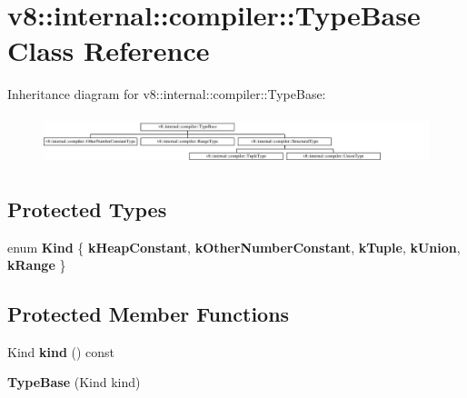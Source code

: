 \hypertarget{classv8_1_1internal_1_1compiler_1_1TypeBase}{}\section{v8\+:\+:internal\+:\+:compiler\+:\+:Type\+Base Class Reference}
\label{classv8_1_1internal_1_1compiler_1_1TypeBase}
Inheritance diagram for v8\+:\+:internal\+:\+:compiler\+:\+:Type\+Base\+:\begin{figure}[H]
\begin{center}
\leavevmode
\includegraphics[height=1.423729cm]{classv8_1_1internal_1_1compiler_1_1TypeBase}
\end{center}
\end{figure}
\subsection*{Protected Types}
\begin{DoxyCompactItemize}
\item 
\mbox{\label{classv8_1_1internal_1_1compiler_1_1TypeBase_a5ead011e7cd273a8618441ef9dc36a6c}} 
enum {\bfseries Kind} \{ \newline
{\bfseries k\+Heap\+Constant}, 
{\bfseries k\+Other\+Number\+Constant}, 
{\bfseries k\+Tuple}, 
{\bfseries k\+Union}, 
\newline
{\bfseries k\+Range}
 \}
\end{DoxyCompactItemize}
\subsection*{Protected Member Functions}
\begin{DoxyCompactItemize}
\item 
\mbox{\label{classv8_1_1internal_1_1compiler_1_1TypeBase_a3e40c4ee0621fa98a400ae61874bfedc}} 
Kind {\bfseries kind} () const
\item 
\mbox{\label{classv8_1_1internal_1_1compiler_1_1TypeBase_a4603aa9be05d0785ca6a1440a9dc6d0c}} 
{\bfseries Type\+Base} (Kind kind)
\end{DoxyCompactItemize}
